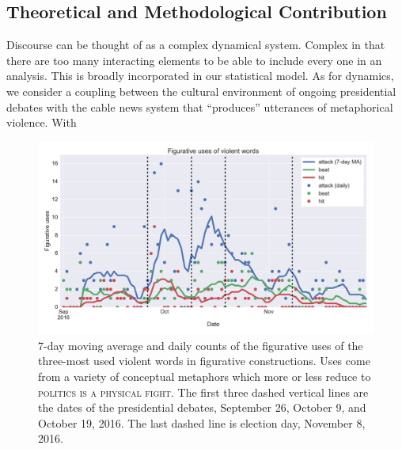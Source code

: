 \subsection{Theoretical and Methodological Contribution}
\label{sub:Theoretical-and-Methodological-Contribution}

Discourse can be thought of as a complex dynamical system. Complex in that
there are too many interacting elements to be able to include every one in
an analysis. This is broadly incorporated in our statistical model. 
As for dynamics, we consider a coupling between the cultural environment 
of ongoing presidential debates with the cable news system that ``produces''
utterances of metaphorical violence. With 

\begin{figure}
\begin{center}
  \hspace*{-.25in}
  \includegraphics[width=\textwidth]{figures/fig_uses_violent_words-FIG1.pdf}
\end{center}
\caption{
  7-day moving average and daily counts of the figurative uses of the three-most
  used violent words in figurative constructions. Uses come from a variety of
  conceptual metaphors which more or less reduce to 
  \textsc{politics is a physical fight}. The first three dashed 
  vertical lines are the dates of the presidential debates, 
  September 26, October 9, and October 19, 2016. The last dashed
  line is election day, November 8, 2016.
}
\label{fig:timeseries}
\end{figure}


